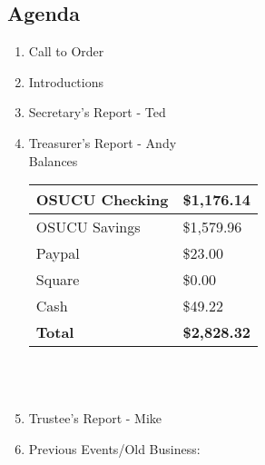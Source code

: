 \documentclass[letter,11pt]{extarticle}
\begin{document}
	\subsection*{Agenda}
	\begin{enumerate}
		\item Call to Order
		\item Introductions
		\item Secretary's Report - Ted
		\item Treasurer's Report - Andy \\
				Balances 
			\begin{tabular}{|l|l|} \hline
				OSUCU Checking & \$1,176.14 \\ \hline
				OSUCU Savings & \$1,579.96 \\ \hline
				Paypal & \$23.00 \\ \hline
				Square & \$0.00 \\ \hline
				Cash & \$49.22 \\ \hline
				\textbf{Total} & \textbf{\$2,828.32} \\ \hline
			\end{tabular} \\ \\
		\item Trustee's Report - Mike
		\item Previous Events/Old Business:
			

\end{enumerate}
\end{document}
